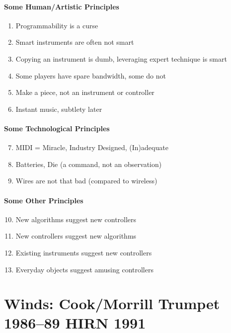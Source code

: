 \paragraph{Some Human/Artistic Principles}

\begin{enumerate}
	\item Programmability is a curse
	\item Smart instruments are often not smart
	\item Copying an instrument is dumb, leveraging expert technique is smart
	\item Some players have spare bandwidth, some do not
	\item Make a piece, not an instrument or controller
	\item Instant music, subtlety later
\end{enumerate}

\paragraph{Some Technological Principles}

\begin{enumerate}
 \setcounter{enumi}{6}
 	\item MIDI = Miracle, Industry Designed, (In)adequate
	\item Batteries, Die (a command, not an observation)
	\item Wires are not that bad (compared to wireless)
\end{enumerate}

\paragraph{Some Other Principles}

\begin{enumerate}
 \setcounter{enumi}{9}
 	\item New algorithms suggest new controllers
	\item New controllers suggest new algorithms
	\item Existing instruments suggest new controllers
	\item Everyday objects suggest amusing controllers
\end{enumerate}

\section{Winds:  Cook/Morrill Trumpet 1986--89      HIRN 1991   }

